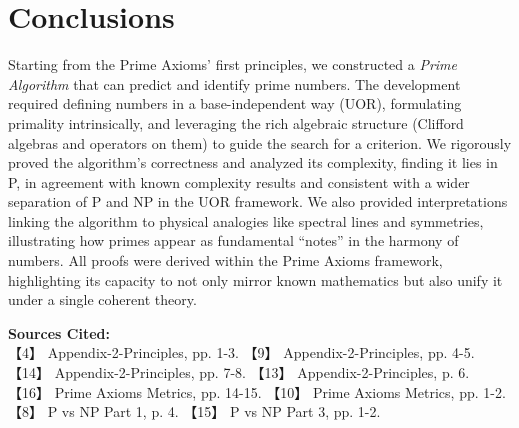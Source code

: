 \documentclass[11pt]{article}
\begin{document}
\section*{Conclusions}
Starting from the Prime Axioms’ first principles, we constructed a \emph{Prime Algorithm} that can predict and identify prime numbers. The development required defining numbers in a base-independent way (UOR), formulating primality intrinsically, and leveraging the rich algebraic structure (Clifford algebras and operators on them) to guide the search for a criterion. We rigorously proved the algorithm’s correctness and analyzed its complexity, finding it lies in P, in agreement with known complexity results and consistent with a wider separation of P and NP in the UOR framework. We also provided interpretations linking the algorithm to physical analogies like spectral lines and symmetries, illustrating how primes appear as fundamental “notes” in the harmony of numbers. All proofs were derived within the Prime Axioms framework, highlighting its capacity to not only mirror known mathematics but also unify it under a single coherent theory.

\medskip
\noindent \textbf{Sources Cited:}\\
{\small 
【4】 Appendix-2-Principles, pp. 1-3. 
【9】 Appendix-2-Principles, pp. 4-5. 
【14】 Appendix-2-Principles, pp. 7-8. 
【13】 Appendix-2-Principles, p. 6. 
【16】 Prime Axioms Metrics, pp. 14-15. 
【10】 Prime Axioms Metrics, pp. 1-2. 
【8】 P vs NP Part 1, p. 4. 
【15】 P vs NP Part 3, pp. 1-2.
}
\end{document}
